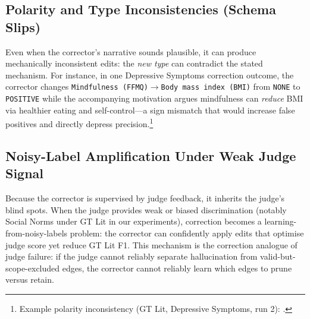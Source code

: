 \subsection{Polarity and Type Inconsistencies (Schema Slips)}
Even when the corrector's narrative sounds plausible, it can produce mechanically inconsistent edits: the \emph{new type} can contradict the stated mechanism. For instance, in one Depressive Symptoms correction outcome, the corrector changes \texttt{Mindfulness (FFMQ)}$\rightarrow$\texttt{Body mass index (BMI)} from \texttt{NONE} to \texttt{POSITIVE} while the accompanying motivation argues mindfulness can \emph{reduce} BMI via healthier eating and self-control---a sign mismatch that would increase false positives and directly depress precision.\footnote{Example polarity inconsistency (GT Lit, Depressive Symptoms, run 2): .}%

\subsection{Noisy-Label Amplification Under Weak Judge Signal}
Because the corrector is supervised by judge feedback, it inherits the judge's blind spots. When the judge provides weak or biased discrimination (notably Social Norms under GT Lit in our experiments), correction becomes a learning-from-noisy-labels problem: the corrector can confidently apply edits that optimise judge score yet reduce GT Lit F1. This mechanism is the correction analogue of judge failure: if the judge cannot reliably separate hallucination from valid-but-scope-excluded edges, the corrector cannot reliably learn which edges to prune versus retain.


